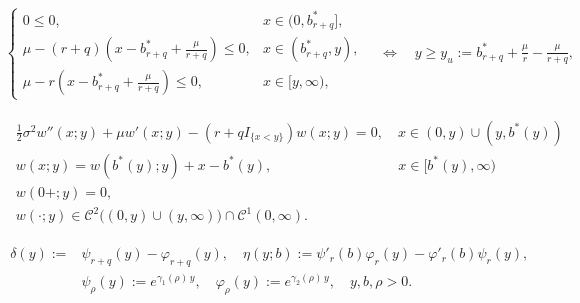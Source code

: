 \documentclass[10pt,a4paper]{amsart}
\renewcommand{\phi}{\varphi}
\begin{document}
\begin{align} \label{yupper_def}
\begin{cases}
0\leq 0, & x \in (0,b^*_{r+q}], \\
\mu - (r+q) (x - b^*_{r+q} + \frac{\mu}{r+q})  \leq 0, & x \in (b^*_{r+q},y), \\
\mu - r (x - b^*_{r+q} + \frac{\mu}{r+q})  \leq 0, & x \in [y,\infty),
\end{cases} 
\quad \Leftrightarrow \quad 
y \geq y_u := b^*_{r+q} + \frac{\mu}r - \frac{\mu}{r+q},
\end{align}

\begin{align}
&\tfrac12 \sigma^2 w''(x;y)+\mu w'(x;y) - (r+qI_{\{x< y\}})w(x;y) = 0, \quad x\in (0,y)\cup(y,b^*(y)) \label{FBP_lowya}\\
&w(x;y) = w(b^*(y);y) + x - b^*(y), \qquad \qquad \qquad \qquad \quad x\in [b^*(y),\infty) \label{FBP_lowyb}\\ &w(0+;y)=0, \label{FBP_lowyc}\\ 
&w(\cdot;y) \in \mathcal{C}^2 \big((0,y) \cup (y,\infty) \big) \cap  \mathcal{C}^1(0,\infty) \label{FBP_lowyd}.
\end{align}

\begin{align}
\label{def:delta}
\begin{split}
\delta(y) := &\psi_{r+q}(y) - \phi_{r+q}(y), \quad 
\eta(y;b) := \psi'_r(b)\phi_r(y) - \phi'_r(b) \psi_r(y), \quad \\ 
&\psi_\rho(y) := e^{\gamma_1(\rho) \,y}, \quad 
\phi_\rho(y) := e^{\gamma_2(\rho) \,y}, \quad 
y, b, \rho > 0 . 
\end{split}
\end{align}
\end{document}
